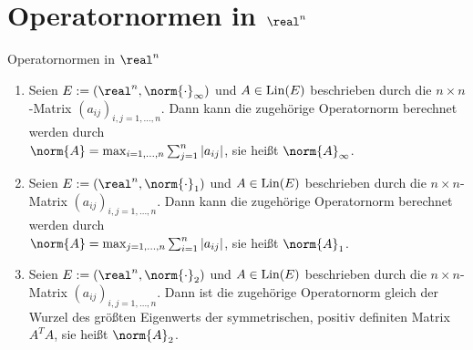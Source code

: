 \section{%
    Operatornormen in \texorpdfstring{$\real^n$}{ℝⁿ}%
}

\begin{Satz}{Operatornormen in $\real^n$}
    \begin{enumerate}
        \item
        Seien $E := (\real^n, \norm{\cdot}_\infty)$ und $A \in \operatorname{Lin}(E)$
        beschrieben durch die $n \times n$-Matrix $(a_{ij})_{i,j=1,\dotsc,n}$.
        Dann kann die zugehörige Operatornorm berechnet werden durch\\
        $\norm{A} = \max_{i=1,\dotsc,n} \sum_{j=1}^n |a_{ij}|$,
        sie heißt  $\norm{A}_\infty$.

        \item
        Seien $E := (\real^n, \norm{\cdot}_1)$ und $A \in \operatorname{Lin}(E)$
        beschrieben durch die $n \times n$-Matrix $(a_{ij})_{i,j=1,\dotsc,n}$.
        Dann kann die zugehörige Operatornorm berechnet werden durch\\
        $\norm{A} = \max_{j=1,\dotsc,n} \sum_{i=1}^n |a_{ij}|$,
        sie heißt  $\norm{A}_1$.

        \item
        Seien $E := (\real^n, \norm{\cdot}_2)$ und $A \in \operatorname{Lin}(E)$
        beschrieben durch die $n \times n$-Matrix $(a_{ij})_{i,j=1,\dotsc,n}$.
        Dann ist die zugehörige Operatornorm gleich der Wurzel des größten Eigenwerts
        der symmetrischen, positiv definiten Matrix $A^T A$,
        sie heißt  $\norm{A}_2$.
    \end{enumerate}
\end{Satz}

\pagebreak
